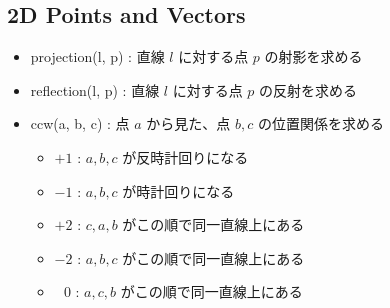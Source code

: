 \subsection{2D Points and Vectors}

\begin{itemize}
	\item projection(l, p) : 直線 $l$ に対する点 $p$ の射影を求める
	\item reflection(l, p) : 直線 $l$ に対する点 $p$ の反射を求める
	\item ccw(a, b, c) : 点 $a$ から見た、点 $b, c$ の位置関係を求める
	\begin{itemize}
	    \item $+1$ : $a, b, c$ が反時計回りになる
	    \item $-1$ : $a, b, c$ が時計回りになる
	    \item $+2$ : $c, a, b$ がこの順で同一直線上にある
	    \item $-2$ : $a, b, c$ がこの順で同一直線上にある
	    \item $\ \:\:0$ : $a, c, b$ がこの順で同一直線上にある
	\end{itemize}
\end{itemize}



